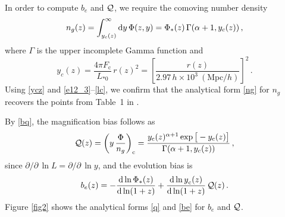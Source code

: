 In order to compute $b_{e}$ and $\mathcal{Q}$, we require the comoving number density
\begin{equation} \label{ng}
n_g(z)=\int_{y_c(z)}^\infty {\mathrm{d}y}\, \Phi(z,y) = \Phi_*(z) \, \Gamma({\alpha+1}, y_c(z)) \,,
\end{equation}
where $\Gamma$ is the upper incomplete Gamma function and
\begin{equation}  \label{ycz}
y_c(z) = \frac{4\pi F_{\mathrm{c}}}{L_{*0}}\, {r}(z)^2  = \left[ \frac{{r}(z)}{2.97\,h\times 10^3~ ({\mathrm{Mpc}}/h)}\right]^2 \,.
\end{equation}
Using \eqref{ycz} and \eqref{e12_3}--\eqref{lc},  we confirm that the analytical form \eqref{ng} for $n_g$ recovers the points from Table~1 in \cite{Yankelevich:2018uaz}. 

By \eqref{bq}, the magnification bias follows as
\begin{equation} \label{q}
{\cal Q}(z) ={\left( y\, \frac{\Phi}{n_g}\right)_{\mathrm{c}}}= \frac{ y_{\mathrm{c}}(z)^{{\alpha+1}}\exp\big[-y_{\mathrm{c}}(z) \big]}{\Gamma({\alpha+1}, y_c(z))}\,,
\end{equation}
since {$\partial/\partial \,{\ln L} = \partial/\partial\, {\ln y}$},  and the evolution bias is
\begin{equation} \label{be}
b_e(z) = - \frac{\mathrm{d} \ln  \Phi_*(z)}{\mathrm{d} \ln (1+z)}+  \frac{ {\mathrm{d}  \ln y}_{\mathrm{c}}(z)}{\mathrm{d} \ln (1+z)}\,{\cal Q}(z)\,.
\end{equation}
Figure \ref{fig2} shows the analytical forms \eqref{q} and \eqref{be}  for  $b_{e}$ and $\mathcal{Q}$.  

